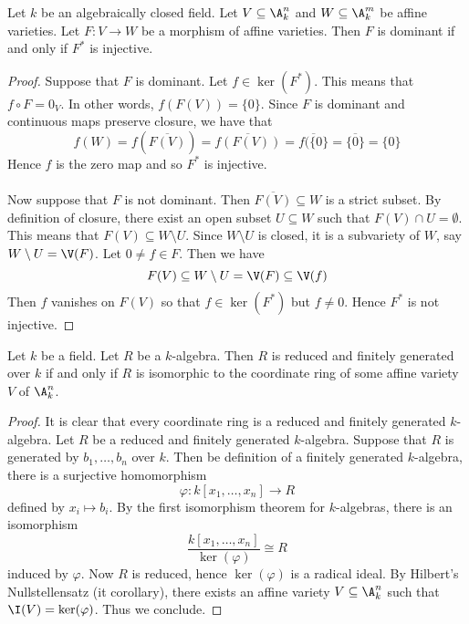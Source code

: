 \documentclass[a4paper]{article}
\begin{document}
\begin{lmm}{}{} Let $k$ be an algebraically closed field. Let $V\subseteq\A_k^n$ and $W\subseteq\A_k^m$ be affine varieties. Let $F:V\to W$ be a morphism of affine varieties. Then $F$ is dominant if and only if $F^\ast$ is injective. \tcbline
\begin{proof}
Suppose that $F$ is dominant. Let $f\in\ker(F^\ast)$. This means that $f\circ F=0_V$. In other words, $f(F(V))=\{0\}$. Since $F$ is dominant and continuous maps preserve closure, we have that $$f(W)=f(\overline{F(V)})=\overline{f(F(V))}=\overline{f(\{0\}}=\overline{\{0\}}=\{0\}$$ Hence $f$ is the zero map and so $F^\ast$ is injective. \\~\\

Now suppose that $F$ is not dominant. Then $\overline{F(V)}\subseteq W$ is a strict subset. By definition of closure, there exist an open subset $U\subseteq W$ such that $F(V)\cap U=\emptyset$. This means that $F(V)\subseteq W\setminus U$. Since $W\setminus U$ is closed, it is a subvariety of $W$, say $W\setminus U=\V(F)$. Let $0\neq f\in F$. Then we have $$F(V)\subseteq W\setminus U=\V(F)\subseteq\V(f)$$ Then $f$ vanishes on $F(V)$ so that $f\in\ker(F^\ast)$ but $f\neq 0$. Hence $F^\ast$ is not injective. 
\end{proof}
\end{lmm}

\begin{prp}{}{} Let $k$ be a field. Let $R$ be a $k$-algebra. Then $R$ is reduced and finitely generated over $k$ if and only if $R$ is isomorphic to the coordinate ring of some affine variety $V$ of $\A_k^n$. \tcbline
\begin{proof}
It is clear that every coordinate ring is a reduced and finitely generated $k$-algebra. Let $R$ be a reduced and finitely generated $k$-algebra. Suppose that $R$ is generated by $b_1,\dots,b_n$ over $k$. Then be definition of a finitely generated $k$-algebra, there is a surjective homomorphism $$\varphi:k[x_1,\dots,x_n]\to R$$ defined by $x_i\mapsto b_i$. By the first isomorphism theorem for $k$-algebras, there is an isomorphism $$\frac{k[x_1,\dots,x_n]}{\ker(\varphi)}\cong R$$ induced by $\varphi$. Now $R$ is reduced, hence $\ker(\varphi)$ is a radical ideal. By Hilbert's Nullstellensatz (it corollary), there exists an affine variety $V\subseteq\A_k^n$ such that $\I(V)=\ker(\varphi)$. Thus we conclude. 
\end{proof}
\end{prp}
\end{document}
